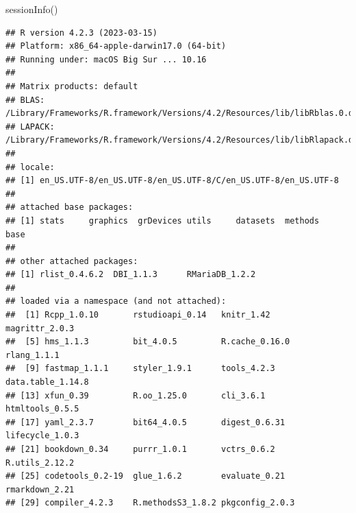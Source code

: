 \documentclass[
  11pt,
  oneside]{book}
\newenvironment{Shaded}{\begin{snugshade}}{\end{snugshade}}
\newcommand{\AttributeTok}[1]{\textcolor[rgb]{0.77,0.63,0.00}{#1}}
\newcommand{\CommentTok}[1]{\textcolor[rgb]{0.56,0.35,0.01}{\textit{#1}}}
\newcommand{\ConstantTok}[1]{\textcolor[rgb]{0.00,0.00,0.00}{#1}}
\newcommand{\DecValTok}[1]{\textcolor[rgb]{0.00,0.00,0.81}{#1}}
\newcommand{\FunctionTok}[1]{\textcolor[rgb]{0.00,0.00,0.00}{#1}}
\newcommand{\NormalTok}[1]{#1}
\newcommand{\OtherTok}[1]{\textcolor[rgb]{0.56,0.35,0.01}{#1}}
\newcommand{\SpecialCharTok}[1]{\textcolor[rgb]{0.00,0.00,0.00}{#1}}
\newcommand{\StringTok}[1]{\textcolor[rgb]{0.31,0.60,0.02}{#1}}
\begin{document}
\begin{Shaded}
\end{Shaded}

\begin{Shaded}
\begin{Highlighting}[]
\FunctionTok{sessionInfo}\NormalTok{()}
\end{Highlighting}
\end{Shaded}

\begin{verbatim}
## R version 4.2.3 (2023-03-15)
## Platform: x86_64-apple-darwin17.0 (64-bit)
## Running under: macOS Big Sur ... 10.16
## 
## Matrix products: default
## BLAS:   /Library/Frameworks/R.framework/Versions/4.2/Resources/lib/libRblas.0.dylib
## LAPACK: /Library/Frameworks/R.framework/Versions/4.2/Resources/lib/libRlapack.dylib
## 
## locale:
## [1] en_US.UTF-8/en_US.UTF-8/en_US.UTF-8/C/en_US.UTF-8/en_US.UTF-8
## 
## attached base packages:
## [1] stats     graphics  grDevices utils     datasets  methods   base     
## 
## other attached packages:
## [1] rlist_0.4.6.2  DBI_1.1.3      RMariaDB_1.2.2
## 
## loaded via a namespace (and not attached):
##  [1] Rcpp_1.0.10       rstudioapi_0.14   knitr_1.42        magrittr_2.0.3   
##  [5] hms_1.1.3         bit_4.0.5         R.cache_0.16.0    rlang_1.1.1      
##  [9] fastmap_1.1.1     styler_1.9.1      tools_4.2.3       data.table_1.14.8
## [13] xfun_0.39         R.oo_1.25.0       cli_3.6.1         htmltools_0.5.5  
## [17] yaml_2.3.7        bit64_4.0.5       digest_0.6.31     lifecycle_1.0.3  
## [21] bookdown_0.34     purrr_1.0.1       vctrs_0.6.2       R.utils_2.12.2   
## [25] codetools_0.2-19  glue_1.6.2        evaluate_0.21     rmarkdown_2.21   
## [29] compiler_4.2.3    R.methodsS3_1.8.2 pkgconfig_2.0.3
\end{verbatim}
\end{document}
